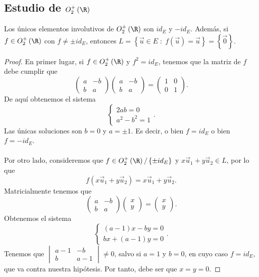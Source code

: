 \subsection*{Estudio de $\displaystyle O^{+}_{2}\left(\R\right) $}
\begin{ftheorem}[]
	\normalfont Los únicos elementos involutivos de $\displaystyle O^{+}_{2}\left(\R\right) $ son $\displaystyle id _{E} $ y $\displaystyle -id _{E} $. Además, si $\displaystyle f \in O^{+}_{2}\left(\R\right) $ con $\displaystyle f \neq \pm id _{E}$, entonces $\displaystyle L = \left\{ \vec{u} \in E \; : \; f\left(\vec{u}\right) = \vec{u}\right\} = \left\{ \vec{0}\right\}  $.
\end{ftheorem}
\begin{proof}
	En primer lugar, si $\displaystyle f \in O^{+}_{2}\left(\R\right) $ y $\displaystyle f^{2} = id _{E} $, tenemos que la matriz de $\displaystyle f $ debe cumplir que
	\[\begin{pmatrix} a & - b \\ b & a \end{pmatrix} \begin{pmatrix} a & - b \\ b & a \end{pmatrix} = \begin{pmatrix} 1 & 0 \\ 0 & 1 \end{pmatrix} .\]
	De aquí obtenemos el sistema
	\[
	\begin{cases}
	2ab = 0 \\
	a^{2}-b^{2} = 1
	\end{cases}
	.\]
	Las únicas soluciones son $\displaystyle b = 0 $ y $\displaystyle a = \pm 1 $. Es decir, o bien $\displaystyle f = id _{E} $ o bien $\displaystyle f = - id _{E} $. \\ \\
	Por otro lado, consideremos que $\displaystyle f \in O^{+}_{2}\left(\R\right) / \left\{ \pm id _{E}\right\}  $ y  $\displaystyle x\vec{u}_{1} + y\vec{u}_{2} \in L $, por lo que
	\[f\left(x\vec{u}_{1} + y\vec{u}_{2}\right) = x\vec{u}_{1} + y\vec{u}_{2} .\]
	Matricialmente tenemos que
	\[\begin{pmatrix} a & - b \\ b & a\end{pmatrix}\begin{pmatrix} x \\ y \end{pmatrix} = \begin{pmatrix} x \\ y \end{pmatrix} .\]
	Obtenemos el sistema
	\[
	\begin{cases}
		\left(a-1\right)x -by = 0\\
		bx + \left(a-1\right)y = 0
	\end{cases}
	.\]
	Tenemos que $\displaystyle \begin{vmatrix} a - 1 & - b \\ b & a - 1 \end{vmatrix} \neq 0 $, salvo si $\displaystyle a = 1 $ y $\displaystyle b = 0 $, en cuyo caso $\displaystyle f = id _{E} $, que va contra nuestra hipótesis. Por tanto, debe ser que $\displaystyle x = y = 0 $. 
\end{proof}
